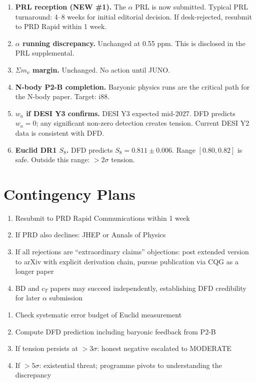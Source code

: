 \documentclass[11pt,a4paper]{article}
\begin{document}
\begin{enumerate}
\item \textbf{PRL reception (NEW \#1).} The $\alpha$ PRL is now submitted. Typical PRL turnaround: 4--8 weeks for initial editorial decision. If desk-rejected, resubmit to PRD Rapid within 1 week.

\item \textbf{$\alpha$ running discrepancy.} Unchanged at 0.55 ppm. This is disclosed in the PRL supplemental.

\item \textbf{$\Sigma m_\nu$ margin.} Unchanged. No action until JUNO.

\item \textbf{N-body P2-B completion.} Baryonic physics runs are the critical path for the N-body paper. Target: i88.

\item \textbf{$w_a$ if DESI Y3 confirms.} DESI Y3 expected mid-2027. DFD predicts $w_a = 0$; any significant non-zero detection creates tension. Current DESI Y2 data is consistent with DFD.

\item \textbf{Euclid DR1 $S_8$.} DFD predicts $S_8 = 0.811 \pm 0.006$. Range $[0.80, 0.82]$ is safe. Outside this range: $> 2\sigma$ tension.
\end{enumerate}

\section{Contingency Plans}

\begin{tcolorbox}[colback=yellow!5!white, colframe=dfdyellow, title=\textbf{If PRL Desk-Rejects}]
\begin{enumerate}[nosep]
\item Resubmit to PRD Rapid Communications within 1 week
\item If PRD also declines: JHEP or Annals of Physics
\item If all rejections are ``extraordinary claims'' objections: post extended version to arXiv with explicit derivation chain, pursue publication via CQG as a longer paper
\item BD and $c_T$ papers may succeed independently, establishing DFD credibility for later $\alpha$ submission
\end{enumerate}
\end{tcolorbox}

\begin{tcolorbox}[colback=yellow!5!white, colframe=dfdyellow, title=\textbf{If Euclid DR1 Shows $S_8 < 0.80$ or $S_8 > 0.82$}]
\begin{enumerate}[nosep]
\item Check systematic error budget of Euclid measurement
\item Compute DFD prediction including baryonic feedback from P2-B
\item If tension persists at $> 3\sigma$: honest negative escalated to MODERATE
\item If $> 5\sigma$: existential threat; programme pivots to understanding the discrepancy
\end{enumerate}
\end{tcolorbox}
\end{document}
